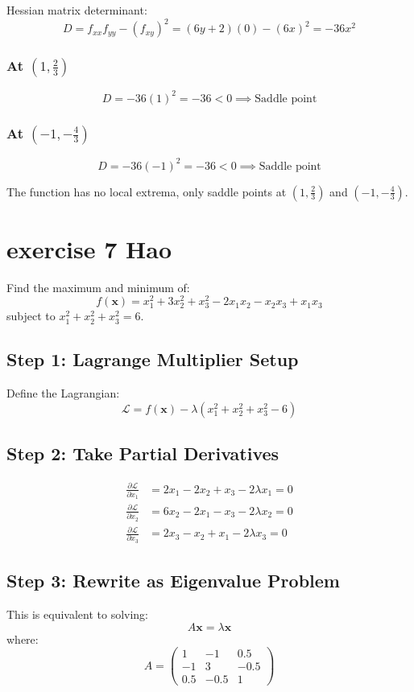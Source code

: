 \documentclass{article}
\begin{document}
Hessian matrix determinant:
\[ D = f_{xx}f_{yy} - (f_{xy})^{2} = (6y + 2)(0) - (6x)^{2} = -36x^{2} \]

\subsubsection*{At $(1, \frac{2}{3})$}
\[ D = -36(1)^{2} = -36 < 0 \implies \text{Saddle point} \]

\subsubsection*{At $(-1, -\frac{4}{3})$}
\[ D = -36(-1)^{2} = -36 < 0 \implies \text{Saddle point} \]

The function has no local extrema, only saddle points at $(1, \frac{2}{3})$ and $(-1, -\frac{4}{3})$.


\section{exercise 7 Hao}
Find the maximum and minimum of:
\[ f(\mathbf{x}) = x_{1}^{2} + 3x_{2}^{2} + x_{3}^{2} - 2x_{1}x_{2} - x_{2}x_{3} + x_{1}x_{3} \]
subject to $x_{1}^{2} + x_{2}^{2} + x_{3}^{2} = 6$.

\subsection*{Step 1: Lagrange Multiplier Setup}
Define the Lagrangian:
\[ \mathcal{L} = f(\mathbf{x}) - \lambda(x_{1}^{2} + x_{2}^{2} + x_{3}^{2} - 6) \]

\subsection*{Step 2: Take Partial Derivatives}
\begin{align*}
    \frac{\partial \mathcal{L}}{\partial x_{1}} & = 2x_{1} - 2x_{2} + x_{3} - 2\lambda x_{1} = 0 \\
    \frac{\partial \mathcal{L}}{\partial x_{2}} & = 6x_{2} - 2x_{1} - x_{3} - 2\lambda x_{2} = 0 \\
    \frac{\partial \mathcal{L}}{\partial x_{3}} & = 2x_{3} - x_{2} + x_{1} - 2\lambda x_{3} = 0
\end{align*}

\subsection*{Step 3: Rewrite as Eigenvalue Problem}
This is equivalent to solving:
\[ A\mathbf{x} = \lambda\mathbf{x} \]
where:
\[ A = \begin{pmatrix}
        1   & -1   & 0.5  \\
        -1  & 3    & -0.5 \\
        0.5 & -0.5 & 1
    \end{pmatrix} \]
\end{document}
